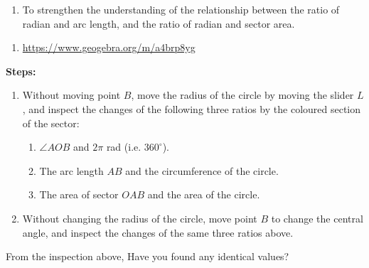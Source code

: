 \documentclass{report}
\begin{document}
\begin{explore}
	        
	\begin{enumerate}[label=\textbf{Aim:} ,leftmargin=4.4em]
		\item To strengthen the understanding of the relationship between the ratio of radian and arc length, and the ratio of radian and sector area.
	\end{enumerate}
	\vspace{-2em}
	\begin{enumerate}[label=\textbf{Tool:} ,leftmargin=2em, align=left]
		\item \url{https://www.geogebra.org/m/a4brp8yg}
	\end{enumerate}
	\vspace{-1em}
	        
	\textbf{Steps:}
	\vspace{-1em}
	\begin{enumerate}
		\item Without moving point $B$, move the radius of the circle by moving the slider $L$, and inspect the changes of the following three ratios by the coloured section of the sector:
		      \begin{enumerate}[label=(\arabic*)]
		      	\item $\angle AOB$ and $2\pi$ rad (i.e. $360^\circ$).
		      	\item The arc length $AB$ and the circumference of the circle.
		      	\item The area of sector $OAB$ and the area of the circle.
		      \end{enumerate}
		\item Without changing the radius of the circle, move point $B$ to change the central angle, and inspect the changes of the same three ratios above.
	\end{enumerate}
	
	From the inspection above, Have you found any identical values?
\end{explore}

\newpage
\end{document}
